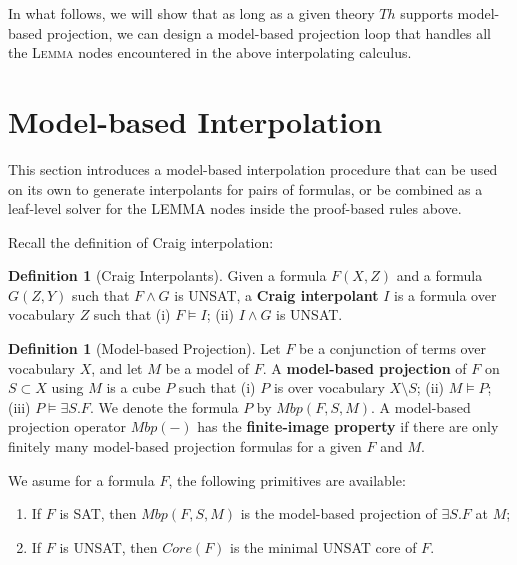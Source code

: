 \documentclass[11pt]{article}
\theoremstyle{plain}
\theoremstyle{definition}
\newtheorem{definition}[theorem]{Definition}
\theoremstyle{remark}
\begin{document}
In what follows, we will show that as long as a given theory $Th$ supports model-based projection, we can design a model-based projection loop that handles all the \textsc{Lemma} nodes encountered in the above interpolating calculus.

\section{Model-based Interpolation}

This section introduces a model-based interpolation procedure that can be used on its own to generate interpolants for pairs of formulas, or be combined as a leaf-level solver for the LEMMA nodes inside the proof-based rules above.

Recall the definition of Craig interpolation:
\begin{definition}[Craig Interpolants]

Given a formula $F(X, Z)$ and a formula $G(Z, Y)$ such that $F \wedge G$ is UNSAT, a \textbf{Craig interpolant} $I$ is a formula over vocabulary $Z$ such that (i) $F \vDash I$; (ii) $I \wedge G$ is UNSAT.
\end{definition}



\begin{definition}[Model-based Projection]
    Let $F$ be a conjunction of terms over vocabulary $X$, and let $M$ be a model of $F$. A \textbf{model-based projection} of $F$ on $S\subset X$ using $M$ is a cube $P$ such that
    (i) $P$ is over vocabulary $X\setminus S$; (ii) $M\vDash P$; (iii) $P \vDash \exists S.F$. We denote the formula $P$ by $Mbp(F,S,M)$. A model-based projection operator $Mbp(-)$ has the \textbf{finite-image property} if there are only finitely many model-based projection formulas for a given $F$ and $M$.
\end{definition}

We asume for a formula $F$, the following primitives are available:
\begin{enumerate}
    \item If $F$ is SAT, then $Mbp(F,S,M)$ is the model-based projection of $\exists S. F$ at $M$;
    \item If $F$ is UNSAT, then $Core(F)$ is the minimal UNSAT core of $F$.
\end{enumerate}
\end{document}
